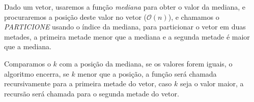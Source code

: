 \documentclass[a4paper, 12pt]{article}
\begin{document}
Dado um vetor, usaremos a função \textit{mediana} para obter o valor da mediana,
e procuraremos a posição deste valor no vetor ($\mathcal{O}(n)$), e chamamos o 
\textit{PARTICIONE} usando o índice da mediana, para particionar o vetor em duas 
metades, a primeira metade menor que a mediana e a segunda metade é maior que a
mediana.

Comparamos o $k$ com a posição da mediana, se os valores forem iguais, o
algoritmo encerra, se $k$ menor que a posição, a função será chamada
recursivamente para a primeira metade do vetor, caso $k$ seja o valor maior, a
recursão será chamada para o segunda metade do vetor.
\end{document}
